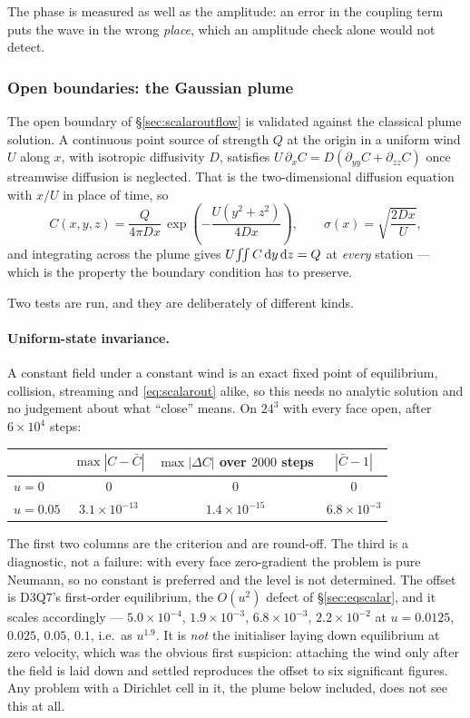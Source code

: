 \documentclass[11pt,a4paper]{article}
\begin{document}
\noindent The phase is measured as well as the amplitude: an error in the
coupling term puts the wave in the wrong \emph{place}, which an amplitude check
alone would not detect.
\subsubsection{Open boundaries: the Gaussian plume}
\label{sec:plume}

The open boundary of \S\ref{sec:scalaroutflow} is validated against the
classical plume solution. A continuous point source of strength $Q$ at the
origin in a uniform wind $U$ along $x$, with isotropic diffusivity $D$,
satisfies $U\,\partial_x C = D(\partial_{yy}C + \partial_{zz}C)$ once
streamwise diffusion is neglected. That is the two-dimensional diffusion
equation with $x/U$ in place of time, so
\begin{equation}
  C(x,y,z) = \frac{Q}{4\pi D x}\,
             \exp\!\left(-\frac{U(y^2+z^2)}{4Dx}\right),
  \qquad \sigma(x) = \sqrt{\frac{2Dx}{U}} ,
  \label{eq:plume}
\end{equation}
and integrating across the plume gives $U\!\iint C\,{\rm d}y\,{\rm d}z = Q$ at
\emph{every} station --- which is the property the boundary condition has to
preserve.

Two tests are run, and they are deliberately of different kinds.

\paragraph{Uniform-state invariance.} A constant field under a constant wind is
an exact fixed point of equilibrium, collision, streaming and
\eqref{eq:scalarout} alike, so this needs no analytic solution and no judgement
about what ``close'' means. On $24^3$ with every face open, after $6\times10^4$
steps:
\begin{center}
\begin{tabular}{lccc}
\toprule
 & $\max|C-\bar{C}|$ & $\max|\Delta C|$ over $2000$ steps & $|\bar{C}-1|$ \\
\midrule
$u=0$    & $0$ & $0$ & $0$ \\
$u=0.05$ & $3.1\times10^{-13}$ & $1.4\times10^{-15}$ & $6.8\times10^{-3}$ \\
\bottomrule
\end{tabular}
\end{center}

\noindent The first two columns are the criterion and are round-off. The third
is a diagnostic, not a failure: with every face zero-gradient the problem is
pure Neumann, so no constant is preferred and the level is not determined. The
offset is D3Q7's first-order equilibrium, the $O(u^2)$ defect of
\S\ref{sec:eqscalar}, and it scales accordingly --- $5.0\times10^{-4}$,
$1.9\times10^{-3}$, $6.8\times10^{-3}$, $2.2\times10^{-2}$ at $u=0.0125$,
$0.025$, $0.05$, $0.1$, i.e.\ as $u^{1.9}$. It is \emph{not} the initialiser
laying down equilibrium at zero velocity, which was the obvious first
suspicion: attaching the wind only after the field is laid down and settled
reproduces the offset to six significant figures. Any problem with a Dirichlet
cell in it, the plume below included, does not see this at all.
\end{document}
